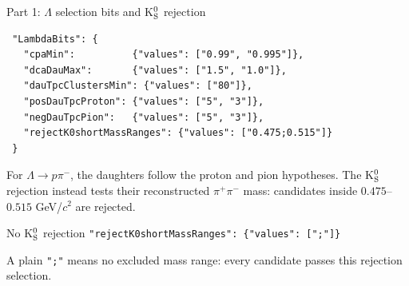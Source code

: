\begin{frame}[fragile]{Part 1: $\Lambda$ selection bits and K$^0_{\rm S}$ rejection}
 \begin{lstlisting}
 "LambdaBits": {
   "cpaMin":          {"values": ["0.99", "0.995"]},
   "dcaDauMax":       {"values": ["1.5", "1.0"]},
   "dauTpcClustersMin": {"values": ["80"]},
   "posDauTpcProton": {"values": ["5", "3"]},
   "negDauTpcPion":   {"values": ["5", "3"]},
   "rejectK0shortMassRanges": {"values": ["0.475;0.515"]}
 }
 \end{lstlisting}
 \small For $\Lambda\to p\pi^-$, the daughters follow the proton and pion hypotheses. The K$^0_{\rm S}$ rejection instead tests their reconstructed $\pi^+\pi^-$ mass: candidates inside $0.475$--$0.515$ GeV/$c^2$ are rejected.
 \begin{block}{No K$^0_{\rm S}$ rejection}
 \texttt{"rejectK0shortMassRanges": \{"values": [";"]\}}\par
 A plain \texttt{";"} means no excluded mass range: every candidate passes this rejection selection.
 \end{block}
\end{frame}

